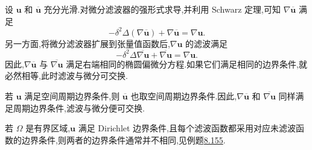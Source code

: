 \begin{note}[微分滤波与空间微分的可交换性]
\label{note:les-differential-filter-commutation}
设 $\bm{u}$ 和 $\overline{\bm{u}}$ 充分光滑.对微分滤波器的强形式求导,并利用 Schwarz 定理,可知 $\nabla\overline{\bm{u}}$ 满足
\[
 -\delta^2\Delta(\nabla\overline{\bm{u}})
 +\nabla\overline{\bm{u}}
 =\nabla\bm{u}.
\]
另一方面,将微分滤波器扩展到张量值函数后,$\nabla\bm{u}$ 的滤波满足
\[
 -\delta^2\Delta\overline{\nabla\bm{u}}
 +\overline{\nabla\bm{u}}
 =\nabla\bm{u}.
\]
因此,$\nabla\overline{\bm{u}}$ 与 $\overline{\nabla\bm{u}}$ 满足右端相同的椭圆偏微分方程.如果它们满足相同的边界条件,就必然相等,此时滤波与微分可交换.

若 $\bm{u}$ 满足空间周期边界条件,则 $\overline{\bm{u}}$ 也取空间周期边界条件.因此,$\nabla\overline{\bm{u}}$ 和 $\overline{\nabla\bm{u}}$ 同样满足周期边界条件,滤波与微分便可交换.

若 $\Omega$ 是有界区域,$\bm{u}$ 满足 Dirichlet 边界条件,且每个滤波函数都采用对应未滤波函数的边界条件,则两者的边界条件通常并不相同,见例题\hyperref[ex:les-differential-filter-commutation-error]{8.155}.
\end{note}

